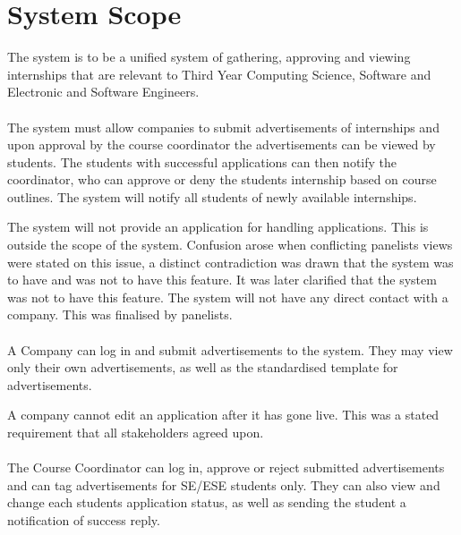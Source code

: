 \documentclass{l3deliverable}
\begin{document}

\section{System Scope}




The system is to be a unified system of gathering, approving and viewing internships that are relevant to Third Year Computing Science, Software and Electronic and Software Engineers.
\\ \\
The system  must allow companies to submit advertisements 
of internships and upon approval by the course coordinator the 
advertisements can be viewed by students. The students with successful applications can then notify 
the coordinator, who can approve or deny the students internship based on 
course outlines. The system will notify all students of newly available internships.

The system will not provide an application for handling applications. This is outside the scope of the system. Confusion arose when conflicting panelists views were stated on this issue, a distinct contradiction was drawn that the system was to have and was not to have this feature. It was later clarified that the system was not to have this feature. The system will not have any direct contact with a company. This was finalised by panelists.
\\\\
A Company can log in and submit advertisements to the system. They may 
view only their own advertisements, as well as the standardised template for 
advertisements.

A company cannot edit an application after it has gone live. This was a stated requirement that all stakeholders agreed upon. 
\\\\
The Course Coordinator can log in, approve or reject submitted advertisements and can tag advertisements for SE/ESE students only. They can also view and change each students application status, as well as sending 
the student a notification of success reply.
\end{document}
